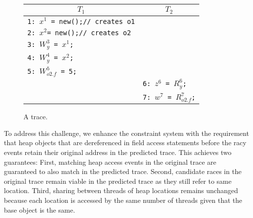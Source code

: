 \begin{figure}
	\centering
	\begin{tabular}{ll}
		\hline
		\multicolumn{1}{c}{$T_1$} & \multicolumn{1}{c}{$T_2$} \\
		\hline
		{\tt 1: $x^1$ = new();// creates o1} & \\
		{\tt 2: $x^2$= new();// creates o2} & \\
		{\tt 3: $W^3_{y}$ = $x^1$;} & \\
		{\tt 4: $W^4_{y}$ = $x^2$;} & \\
		{\tt 5: $W^5_{o2.f}$ = 5;} & \\	
		& {\tt 6: $z^6$ = $R^6_{y}$;} \\
		& {\tt 7: $w^7$ = $R^7_{o2.f}$;} \\
	\end{tabular}
	\caption{\label{fig:heapAccess} A trace.}
\end{figure}

To address this challenge, we enhance the constraint system with the requirement that heap objects that are dereferenced in field access statements before the racy events retain their original address in the predicted trace.
This achieves two guarantees: First, matching heap access events in the original trace are guaranteed to also match in the predicted trace. Second, candidate races in the original trace remain viable in the predicted trace as they still refer to same location. Third, sharing between threads of heap locations remains unchanged  because
each location is accessed by the same number of threads given that the base object is the same. 







